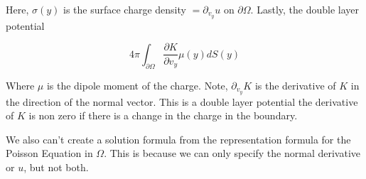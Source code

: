 \documentclass{article}
\newtheorem{one minute paper}[theorem]{One Minute Paper}
\begin{document}
Here, $\sigma(y)$ is the surface charge density $= \partial_{v_y}u$ on $\partial \Omega$. Lastly, the double layer potential 

\begin{equation}
    4\pi \int_{\partial \Omega}\frac{\partial K}{\partial v_y} \mu(y)dS(y)
\end{equation}

Where $\mu$ is the dipole moment of the charge. Note, $\partial_{v_y}K$ is the derivative of $K$ in the direction of the normal vector. This is a double layer potential the derivative of $K$ is non zero if there is a change in the charge in the boundary. 

We also can't create a solution formula from the representation formula for the Poisson Equation in $\Omega$. This is because we can only specify the normal derivative or $u$, but not both. 
\end{document}
